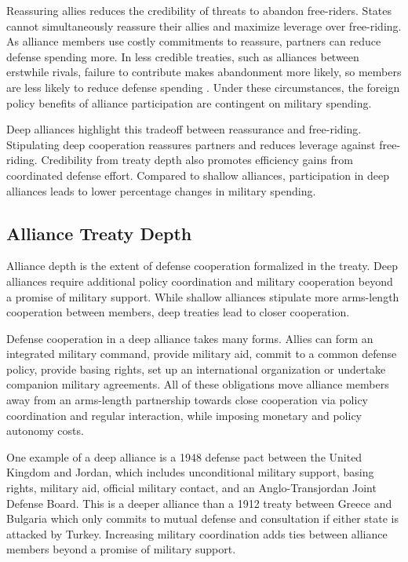 \documentclass[12pt]{article}
\begin{document}
Reassuring allies reduces the credibility of threats to abandon free-riders. 
States cannot simultaneously reassure their allies and maximize leverage over free-riding. 
As alliance members use costly commitments to reassure, partners can reduce defense spending more. 
In less credible treaties, such as alliances between erstwhile rivals, failure to contribute makes abandonment more likely, so members are less likely to reduce defense spending \citep{NiouZeigler2019}. 
Under these circumstances, the foreign policy benefits of alliance participation are contingent on military spending. 


Deep alliances highlight this tradeoff between reassurance and free-riding. 
Stipulating deep cooperation reassures partners and reduces leverage against free-riding. 
Credibility from treaty depth also promotes efficiency gains from coordinated defense effort.
Compared to shallow alliances, participation in deep alliances leads to lower percentage changes in military spending. 



\subsection*{Alliance Treaty Depth} 


Alliance depth is the extent of defense cooperation formalized in the treaty. 
Deep alliances require additional policy coordination and military cooperation beyond a promise of military support. 
While shallow alliances stipulate more arms-length cooperation between members, deep treaties lead to closer cooperation. 


Defense cooperation in a deep alliance takes many forms. 
Allies can form an integrated military command, provide military aid, commit to a common defense policy, provide basing rights, set up an international organization or undertake companion military agreements. 
All of these obligations move alliance members away from an arms-length partnership towards close cooperation via policy coordination and regular interaction, while imposing monetary and policy autonomy costs. 

 
One example of a deep alliance is a 1948 defense pact between the United Kingdom and Jordan, which includes unconditional military support, basing rights, military aid, official military contact, and an Anglo-Transjordan Joint Defense Board.  
This is a deeper alliance than a 1912 treaty between Greece and Bulgaria which only commits to mutual defense and consultation if either state is attacked by Turkey. 
Increasing military coordination adds ties between alliance members beyond a promise of military support.
\end{document}
